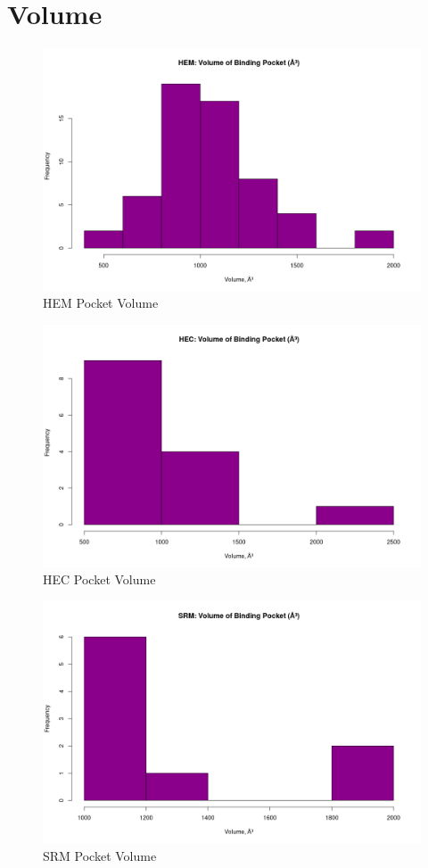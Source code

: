 \section{Volume}
	\begin{figure}
		\caption{HEM Pocket Volume}
		\label{figs:HEM_volume}
		\includegraphics[width=\linewidth]{7A/HEM_volume}
	\end{figure}

	
	\begin{figure}
		\caption{HEC Pocket Volume}
		\label{figs:HEC_volume}
		\includegraphics[width=\linewidth]{7A/HEC_volume}
	\end{figure}
	
	
	\begin{figure}
		\caption{SRM Pocket Volume}
		\label{figs:SRM_volume}
		\includegraphics[width=\linewidth]{7A/SRM_volume}
	\end{figure}
	
